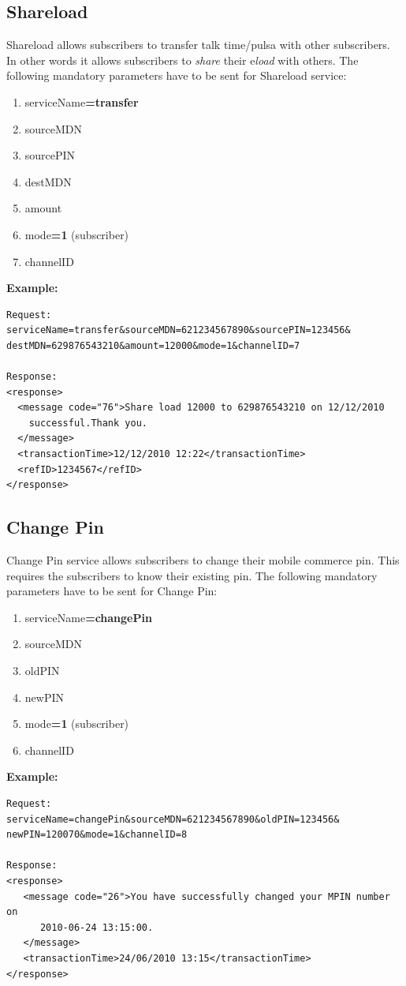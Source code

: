 \documentclass[11pt,titlepage]{article}
\begin{document}
\subsection{Shareload}
Shareload allows subscribers to transfer talk time/pulsa with other subscribers. In other words it allows subscribers to \textit{share} their e\textit{load} with others.
The following mandatory parameters have to be sent for Shareload service:
\begin{enumerate}
\item serviceName\textbf{=transfer}
\item sourceMDN
\item sourcePIN
\item destMDN
\item amount
\item mode\textbf{=1} (subscriber)
\item channelID
\end{enumerate}
\textbf{Example:}
\begin{verbatim}
Request:
serviceName=transfer&sourceMDN=621234567890&sourcePIN=123456&
destMDN=629876543210&amount=12000&mode=1&channelID=7

Response:
<response>
  <message code="76">Share load 12000 to 629876543210 on 12/12/2010
    successful.Thank you.
  </message>
  <transactionTime>12/12/2010 12:22</transactionTime>
  <refID>1234567</refID>
</response>
\end{verbatim}

\subsection{Change Pin}
Change Pin service allows subscribers to change their mobile commerce pin. This requires the subscribers to know their existing pin.
The following mandatory parameters have to be sent for Change Pin:
\begin{enumerate}
\item serviceName\textbf{=changePin}
\item sourceMDN
\item oldPIN
\item newPIN
\item mode\textbf{=1} (subscriber)
\item channelID
\end{enumerate}
\textbf{Example:}
\begin{verbatim}
Request:
serviceName=changePin&sourceMDN=621234567890&oldPIN=123456&
newPIN=120070&mode=1&channelID=8

Response:
<response>
   <message code="26">You have successfully changed your MPIN number on 
      2010-06-24 13:15:00.
   </message>
   <transactionTime>24/06/2010 13:15</transactionTime>
</response>
\end{verbatim}
\end{document}
